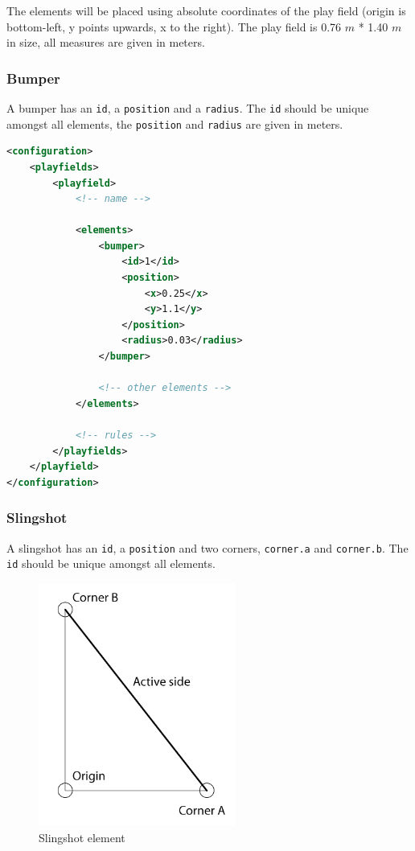 \documentclass[fontsize=12pt,
               paper=a4,
               twoside=false,
               parskip=half,
               ]{scrartcl}
\begin{document}
The elements will be placed using absolute coordinates of the play field (origin is bottom-left, y points upwards, x to the right). The play field is 0.76 $m$ * 1.40 $m$ in size, all measures are given in meters.

\subsubsection{Bumper}

A bumper has an \texttt{id}, a \texttt{position} and a \texttt{radius}. The \texttt{id} should be unique amongst all elements, the \texttt{position} and \texttt{radius} are given in meters.

\begin{minipage}[]{\linewidth}
\begin{lstlisting}[language=xml,label=lst:bumper,caption={bumper}]
<configuration>
	<playfields>
		<playfield>
			<!-- name -->
			
			<elements>
				<bumper>
					<id>1</id>
					<position>
						<x>0.25</x>
						<y>1.1</y>
					</position>
					<radius>0.03</radius>
				</bumper>
				
				<!-- other elements -->
			</elements>
			
			<!-- rules -->
		</playfields>
	</playfield>
</configuration>
\end{lstlisting}
\end{minipage}

\subsubsection{Slingshot}

A slingshot has an \texttt{id}, a \texttt{position} and two corners, \texttt{corner.a} and \texttt{corner.b}. The \texttt{id} should be unique amongst all elements. 

\begin{figure}[h!]
	\centering
	\includegraphics[height=8cm]{./img/manual/slingshot-element.png}
	\caption[Slingshot element]{Slingshot element}
	\label{fig:slingshot_element}
\end{figure}
\end{document}
